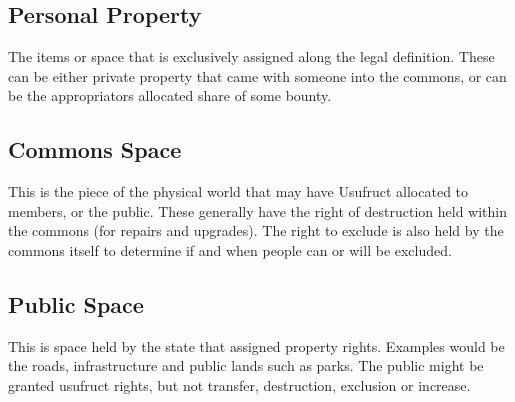 \subsection{Personal Property} The items or space that is exclusively assigned along the legal definition. These can be either private property that came with someone into the commons, or can be the appropriators allocated share of some bounty. 


\subsection{Commons Space} This is the piece of the physical world that may have Usufruct allocated to members, or the public. These generally have the right of destruction held within the commons (for repairs and upgrades). The right to exclude is also held by the commons itself to determine if and when people can or will be excluded. 

\subsection{Public Space} This is space held by the state that assigned property rights. Examples would be the roads, infrastructure and public lands such as parks. The public might be granted usufruct rights, but not transfer, destruction, exclusion or increase. 